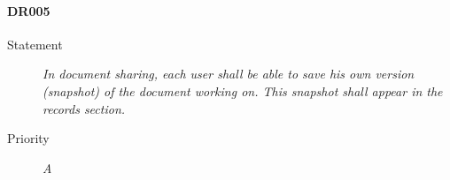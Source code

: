 \paragraph{DR005}
\begin{description}
  \item [Statement] 
  \textit{ In  document sharing, each user shall be able to save his own version (snapshot) of the document working on.
          This snapshot shall appear in the records section.}
\item [Priority] \textit{A}
\end{description}

